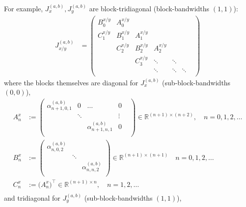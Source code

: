 \documentclass[11pt, oneside]{article}   	%
\newcommand{\R}{\mathbb{R}}
\newcommand{\alphaab}{\alpha^{(a,b)}}
\begin{document}
For example, $J_x^{(a,b)}, J_y^{(a,b)}$ are block-tridiagonal (block-bandwidths $(1,1)$):
\begin{align*}
J_{x/y}^{(a,b)} &= \begin{pmatrix}
		B^{x/y}_0 & A^{x/y}_0 & & & & \\
		C^{x/y}_1 & B^{x/y}_1 & A^{x/y}_1 & & & \\
		& C^{x/y}_2 & B^{x/y}_2 & A^{x/y}_2  & & & \\
		& & C^{x/y}_3 & \ddots & \ddots & \\
		& & & \ddots & \ddots & \ddots \\
	\end{pmatrix}
\end{align*}
where the blocks themselves are diagonal for $J_x^{(a,b)}$ (sub-block-bandwidths $(0,0)$),
\begin{align*}
A^x_n &:= \begin{pmatrix}
		\alphaab_{n+1,0,1} & 0 & \hdots & 0 \\
		& \ddots & & \vdots & \\
		& & \alphaab_{n+1,n,1} & 0 \\
	    \end{pmatrix} \in \R^{(n+1)\times(n+2)}, \quad n = 0,1,2,\dots \\
B^x_n &:= \begin{pmatrix}
		\alphaab_{n,0,2} & & \\
		& \ddots & \\
		& & \alphaab_{n,n,2} \\
	    \end{pmatrix} \in \R^{(n+1)\times(n+1)} \quad n = 0,1,2,\dots \\
C^x_n &:= \big( A^x_n \big)^\top \in \R^{(n+1)\times n},  \quad n = 1,2,\dots \\ 
\nonumber
\end{align*}
and tridiagonal for $J_y^{(a,b)}$ (sub-block-bandwidths $(1,1)$),
\end{document}
